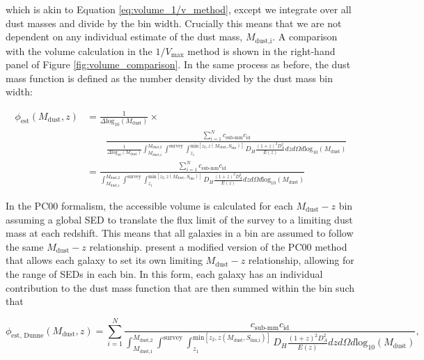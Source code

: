 \noindent which is akin to Equation \ref{eq:volume_1/v_method}, except we integrate over all dust masses and divide by the bin width. Crucially this means that we are not dependent on any individual estimate of the dust mass, $M_{\textrm{dust,i}}$. A comparison with the volume calculation in the $1/V_{\textrm{max}}$ method is shown in the right-hand panel of Figure \ref{fig:volume_comparison}. In the same process as before, the dust mass function is defined as the number density divided by the dust mass bin width:

\begin{align}
    \phi_{\textrm{est}}(M_{\textrm{dust}},z) &= \frac{1}{\Delta \textrm{log}_{10}(M_{\textrm{dust}})} \times \nonumber \\
    & \qquad \frac{\sum_{i=1}^N c_{\scriptscriptstyle \textrm{sub-mm}} c_{\scriptscriptstyle \textrm{id}}}{\frac{1}{\Delta \textrm{log}_{10}(M_\textrm{dust})}\int_{\scriptscriptstyle M_{\textrm{dust,1}}}^{\scriptscriptstyle M_{\textrm{dust,2}}} \int^{\scriptscriptstyle \textrm{survey}} \int_{\scriptscriptstyle z_1}^{\scriptscriptstyle \textrm{min}[z_2, z(M_{\textrm{dust}},S_{\textrm{lim}})]} D_H \frac{(1+z)^2 D_A^2}{E(z)} dz d\Omega d\textrm{log}_{10}(M_\textrm{dust})} \nonumber \\
    &= \frac{\sum_{i=1}^N c_{\scriptscriptstyle \textrm{sub-mm}} c_{\scriptscriptstyle \textrm{id}}}{\int_{\scriptscriptstyle M_{\textrm{dust,1}}}^{\scriptscriptstyle M_{\textrm{dust,2}}} \int^{\scriptscriptstyle \textrm{survey}} \int_{\scriptscriptstyle z_1}^{\scriptscriptstyle \textrm{min}[z_2, z(M_{\textrm{dust}},S_{\textrm{lim}})]} D_H \frac{(1+z)^2 D_A^2}{E(z)} dz d\Omega d\textrm{log}_{10}(M_\textrm{dust})}
\label{eq:phi_pc00_method}
\end{align}

In the PC00 formalism, the accessible volume is calculated for each $M_{\textrm{dust}} - z$ bin assuming a global SED to translate the flux limit of the survey to a limiting dust mass at each redshift. This means that all galaxies in a bin are assumed to follow the same $M_{\textrm{dust}} - z$ relationship. \citealt{Dunne_2011} present a modified version of the PC00 method that allows each galaxy to set its own limiting $M_{\textrm{dust}} - z$ relationship, allowing for the range of SEDs in each bin. In this form, each galaxy has an individual contribution to the dust mass function that are then summed within the bin such that

\begin{equation}
    \phi_{\textrm{est, Dunne}}(M_{\textrm{dust}},z) = \sum_{i=1}^N \frac{c_{\scriptscriptstyle \textrm{sub-mm}} c_{\scriptscriptstyle \textrm{id}}}{\int_{\scriptscriptstyle M_{\textrm{dust,1}}}^{\scriptscriptstyle M_{\textrm{dust,2}}} \int^{\scriptscriptstyle \textrm{survey}} \int_{\scriptscriptstyle z_1}^{\scriptscriptstyle \textrm{min}[z_2, z(M_{\textrm{dust}},S_{\textrm{lim,i}})]} D_H \frac{(1+z)^2 D_A^2}{E(z)} dz d\Omega d\textrm{log}_{10}(M_\textrm{dust})},
\label{eq:phi_pc00_dunne_method}
\end{equation}

